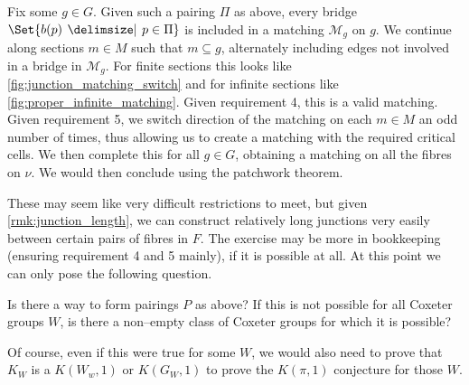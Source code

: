 \documentclass[class=article, crop=false]{standalone}
\begin{document}
Fix some $g \in G$. Given such a pairing $\Pi$ as above, every bridge $\Set{b(p) \given p \in \Pi}$ is included in a matching $\mathcal{M}_g$ on $g$. We continue along sections $m \in M$ such that $m \subseteq g$, alternately including edges not involved in a bridge in $\mathcal{M}_g$. For finite sections this looks like \cref{fig:junction_matching_switch} and for infinite sections like \cref{fig:proper_infinite_matching}. Given requirement 4, this is a valid matching. Given requirement 5, we switch direction of the matching on each $m \in M$ an odd number of times, thus allowing us to create a matching with the required critical cells. We then complete this for all $g \in G$, obtaining a matching on all the fibres on $\nu$. We would then conclude using the patchwork theorem.

These may seem like very difficult restrictions to meet, but given \cref{rmk:junction_length}, we can construct relatively long junctions very easily between certain pairs of fibres in $F$. The exercise may be more in bookkeeping (ensuring requirement 4 and 5 mainly), if it is possible at all. At this point we can only pose the following question.

\begin{question}
    Is there a way to form pairings $P$ as above? If this is not possible for all Coxeter groups $W$, is there a non--empty class of Coxeter groups for which it is possible?
\end{question}

Of course, even if this were true for some $W$, we would also need to prove that $K_W$ is a $K(W_w,1)$ or $K(G_W,1)$ to prove the $K(\pi,1)$ conjecture for those $W$.
\end{document}
